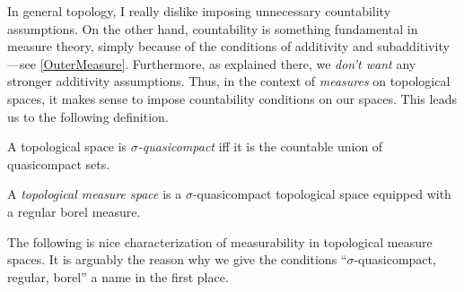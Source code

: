 In general topology, I really dislike imposing unnecessary countability assumptions.  On the other hand, countability is something fundamental in measure theory, simply because of the conditions of additivity and subadditivity---see \cref{OuterMeasure}.  Furthermore, as explained there, we \emph{don't want} any stronger additivity assumptions.  Thus, in the context of \emph{measures} on topological spaces, it makes sense to impose countability conditions on our spaces.  This leads us to the following definition.
\begin{dfn}\label{SigmaQuasicompact}
A topological space is \emph{$\sigma$-quasicompact} iff it is the countable union of quasicompact sets.
\end{dfn}
\begin{dfn}\label{TopologicalMeasureSpace}
A \emph{topological measure space} is a $\sigma$-quasicompact topological space equipped with a regular borel measure.
\end{dfn}
The following is nice characterization of measurability in topological measure spaces.  It is arguably the reason why we give the conditions ``$\sigma$-quasicompact, regular, borel'' a name in the first place.
